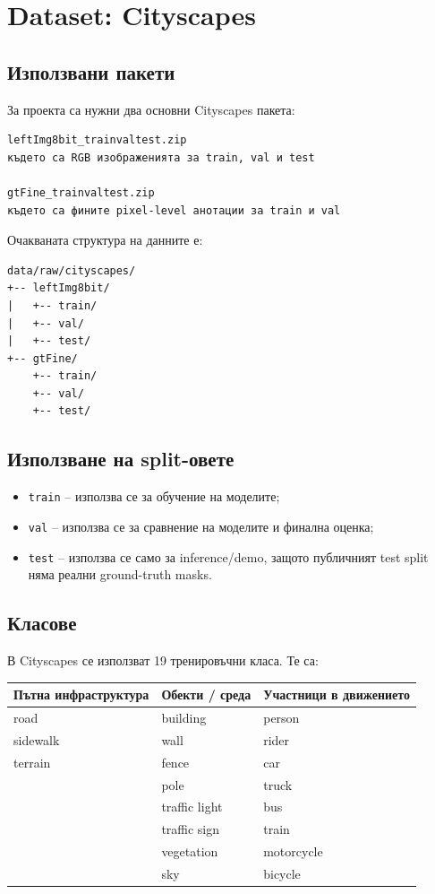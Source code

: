 \documentclass[12pt,a4paper]{article}
\newcommand{\code}[1]{\texttt{#1}}
\begin{document}
\section{Dataset: Cityscapes}

\subsection{Използвани пакети}

За проекта са нужни два основни Cityscapes пакета:

\begin{verbatim}
leftImg8bit_trainvaltest.zip
където са RGB изображенията за train, val и test

gtFine_trainvaltest.zip
където са фините pixel-level анотации за train и val
\end{verbatim}

Очакваната структура на данните е:

\begin{verbatim}
data/raw/cityscapes/
+-- leftImg8bit/
|   +-- train/
|   +-- val/
|   +-- test/
+-- gtFine/
    +-- train/
    +-- val/
    +-- test/
\end{verbatim}

\subsection{Използване на split-овете}

\begin{itemize}
  \item \code{train} -- използва се за обучение на моделите;
  \item \code{val} -- използва се за сравнение на моделите и финална оценка;
  \item \code{test} -- използва се само за inference/demo, защото публичният test split няма реални ground-truth masks.
\end{itemize}

\subsection{Класове}

В Cityscapes се използват 19 тренировъчни класа. Те са:

\begin{longtable}{p{} p{} p{}}
\toprule
Пътна инфраструктура & Обекти / среда & Участници в движението \\
\midrule
road & building & person \\
sidewalk & wall & rider \\
terrain & fence & car \\
 & pole & truck \\
 & traffic light & bus \\
 & traffic sign & train \\
 & vegetation & motorcycle \\
 & sky & bicycle \\
\bottomrule
\end{longtable}
\end{document}
